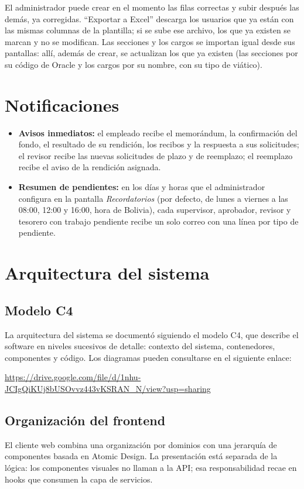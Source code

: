 \documentclass[11pt,letterpaper]{article}
\begin{document}
El administrador puede crear en el momento las filas correctas y subir después las demás, ya corregidas. ``Exportar a Excel'' descarga los usuarios que ya están con las mismas columnas de la plantilla; si se sube ese archivo, los que ya existen se marcan y no se modifican. Las secciones y los cargos se importan igual desde sus pantallas: allí, además de crear, se actualizan los que ya existen (las secciones por su código de Oracle y los cargos por su nombre, con su tipo de viático).

\section{Notificaciones}
\begin{itemize}
  \item \textbf{Avisos inmediatos:} el empleado recibe el memorándum, la confirmación del fondo, el resultado de su rendición, los recibos y la respuesta a sus solicitudes; el revisor recibe las nuevas solicitudes de plazo y de reemplazo; el reemplazo recibe el aviso de la rendición asignada.
  \item \textbf{Resumen de pendientes:} en los días y horas que el administrador configura en la pantalla \emph{Recordatorios} (por defecto, de lunes a viernes a las 08:00, 12:00 y 16:00, hora de Bolivia), cada supervisor, aprobador, revisor y tesorero con trabajo pendiente recibe un solo correo con una línea por tipo de pendiente.
\end{itemize}

\section{Arquitectura del sistema}

\subsection{Modelo C4}
La arquitectura del sistema se documentó siguiendo el modelo C4, que describe el software en niveles sucesivos de detalle: contexto del sistema, contenedores, componentes y código. Los diagramas pueden consultarse en el siguiente enlace:

\begin{center}
\url{https://drive.google.com/file/d/1nhu-JCIgQiKUj8bUSOvvz443vKSRAN_N/view?usp=sharing}
\end{center}

\subsection{Organización del frontend}
El cliente web combina una organización por dominios con una jerarquía de componentes basada en Atomic Design. La presentación está separada de la lógica: los componentes visuales no llaman a la API; esa responsabilidad recae en hooks que consumen la capa de servicios.
\end{document}

